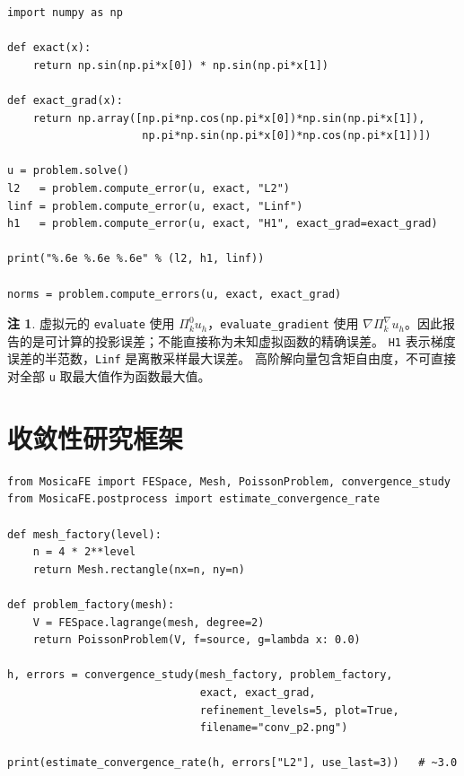 \documentclass[UTF8,11pt,oneside]{ctexbook}
\theoremstyle{definition}
\newtheorem{remark}{注}[chapter]
\theoremstyle{plain}
\newcommand{\code}[1]{\texttt{#1}}
\begin{document}
\begin{lstlisting}[language=MosicaFE,caption={示例 8.1：计算三种范数}]
import numpy as np

def exact(x):
    return np.sin(np.pi*x[0]) * np.sin(np.pi*x[1])

def exact_grad(x):
    return np.array([np.pi*np.cos(np.pi*x[0])*np.sin(np.pi*x[1]),
                     np.pi*np.sin(np.pi*x[0])*np.cos(np.pi*x[1])])

u = problem.solve()
l2   = problem.compute_error(u, exact, "L2")
linf = problem.compute_error(u, exact, "Linf")
h1   = problem.compute_error(u, exact, "H1", exact_grad=exact_grad)

print("%.6e %.6e %.6e" % (l2, h1, linf))

norms = problem.compute_errors(u, exact, exact_grad)
\end{lstlisting}

\begin{remark}
虚拟元的 \code{evaluate} 使用 $\Pi_k^0u_h$，\code{evaluate\_\allowbreak gradient}
使用 $\nabla\Pi_k^\nabla u_h$。因此报告的是可计算的投影误差；不能直接称为未知虚拟函数的精确误差。
\code{H1} 表示梯度误差的半范数，\code{Linf} 是离散采样最大误差。
高阶解向量包含矩自由度，不可直接对全部 \code{u} 取最大值作为函数最大值。

\end{remark}

\section{收敛性研究框架}

\begin{lstlisting}[language=MosicaFE,caption={示例 8.2：自动收敛性研究},label={lst:convstudy}]
from MosicaFE import FESpace, Mesh, PoissonProblem, convergence_study
from MosicaFE.postprocess import estimate_convergence_rate

def mesh_factory(level):
    n = 4 * 2**level
    return Mesh.rectangle(nx=n, ny=n)

def problem_factory(mesh):
    V = FESpace.lagrange(mesh, degree=2)
    return PoissonProblem(V, f=source, g=lambda x: 0.0)

h, errors = convergence_study(mesh_factory, problem_factory,
                              exact, exact_grad,
                              refinement_levels=5, plot=True,
                              filename="conv_p2.png")

print(estimate_convergence_rate(h, errors["L2"], use_last=3))   # ~3.0
\end{lstlisting}
\end{document}
